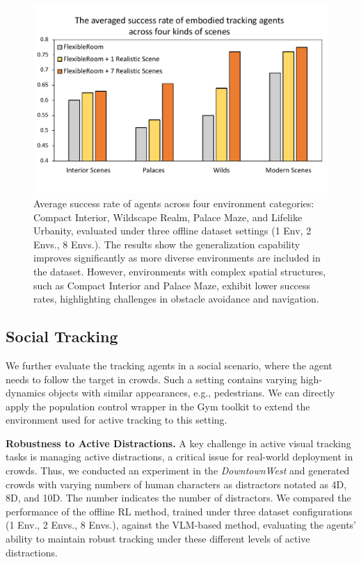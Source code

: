 \documentclass{article}
\begin{document}
\begin{figure}
    \centering
        \vspace{-0.7cm}
    \includegraphics[width=\linewidth]{image/SR_performance.pdf}
    \caption{Average success rate of agents across four environment categories: Compact Interior, Wildscape Realm, Palace Maze, and Lifelike Urbanity, evaluated under three offline dataset settings (1 Env, 2 Envs., 8 Envs.). The results show the generalization capability improves significantly as more diverse environments are included in the dataset. However, environments with complex spatial structures, such as Compact Interior and Palace Maze, exhibit lower success rates, highlighting challenges in obstacle avoidance and navigation.}
    \vspace{-0.4cm}
    \label{fig:eval_SR}
\end{figure}

\vspace{-0.2cm}
\subsection{Social Tracking}
\vspace{-0.2cm}
\label{sec:social_tracking}
We further evaluate the tracking agents in a social scenario, where the agent needs to follow the target in crowds. Such a setting contains varying high-dynamics objects with similar appearances, e.g., pedestrians. We can directly apply the population control wrapper in the Gym toolkit to extend the environment used for active tracking to this setting.

\textbf{Robustness to Active Distractions.}
A key challenge in active visual tracking tasks is managing active distractions, a critical issue for real-world deployment in crowds. 
Thus, we conducted an experiment in the \emph{DowntownWest} and generated crowds with varying numbers of human characters as distractors notated as 4D, 8D, and 10D. The number indicates the number of distractors. We compared the performance of the offline RL method, trained under three dataset configurations (1 Env., 2 Envs., 8 Envs.), against the VLM-based method, evaluating the agents’ ability to maintain robust tracking under these different levels of active distractions.
\end{document}
